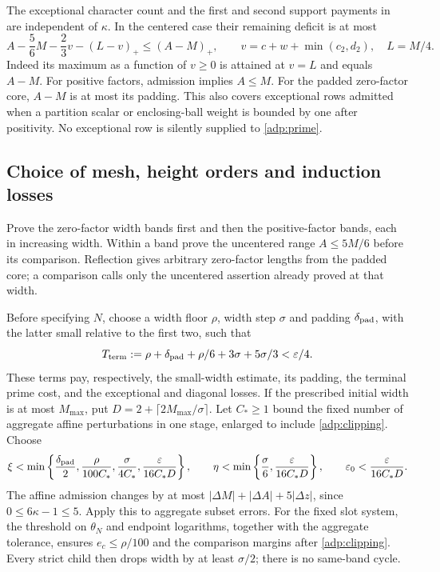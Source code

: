 The exceptional character count and the first and second support
payments in \cite[(18.41)--(18.44)]{OAI26} are independent of
$\kappa$. In the centered case their remaining deficit is at most
\[
 A-\frac56M-\frac23v-(L-v)_+\le(A-M)_+,
 \qquad v=c+w+\min(c_2,d_2),\quad L=M/4 .
\]
Indeed its maximum as a function of $v\ge0$ is attained at $v=L$
and equals $A-M$. For positive factors, admission implies $A\le M$.
For the padded zero-factor core, $A-M$ is at most its padding.
This also covers exceptional rows admitted when a partition scalar
or enclosing-ball weight is bounded by one after positivity.
No exceptional row is silently supplied to \eqref{adp:prime}.

\subsection{Choice of mesh, height orders and induction losses}

Prove the zero-factor width bands first and then the positive-factor
bands, each in increasing width. Within a band prove the uncentered
range $A\le5M/6$ before its comparison. Reflection gives arbitrary
zero-factor lengths from the padded core; a comparison calls only
the uncentered assertion already proved at that width.

Before specifying $N$, choose a width floor $\rho$, width step
$\sigma$ and padding $\delta_{\rm pad}$, with the latter small
relative to the first two, such that
\[
 T_{\rm term}:=\rho+\delta_{\rm pad}+\rho/6+
                         3\sigma+5\sigma/3<\varepsilon/4 .
\]
These terms pay, respectively, the small-width estimate, its padding,
the terminal prime cost, and the exceptional and diagonal losses.
If the prescribed initial width is at most $M_{\max}$, put
$D=2+\lceil2M_{\max}/\sigma\rceil$.
Let $C_*\ge1$ bound the fixed number of aggregate affine
perturbations in one stage, enlarged to include
\eqref{adp:clipping}. Choose
\[
 \xi<\min\left\{\frac{\delta_{\rm pad}}2,
       \frac{\rho}{100C_*},\frac{\sigma}{4C_*},
       \frac{\varepsilon}{16C_*D}\right\},\qquad
 \eta<\min\left\{\frac{\sigma}{6},
       \frac{\varepsilon}{16C_*D}\right\},\qquad
 \varepsilon_0<\frac{\varepsilon}{16C_*D}.
\]
The affine admission changes by at most
$|\Delta M|+|\Delta A|+5|\Delta z|$, since
$0\le6\kappa-1\le5$. Apply this to aggregate subset errors.
For the fixed slot system, the threshold on $\theta_N$ and endpoint
logarithms, together with the aggregate tolerance, ensures
$e_c\le\rho/100$ and the comparison margins after \eqref{adp:clipping}.
Every strict child then drops width by at least $\sigma/2$;
there is no same-band cycle.

